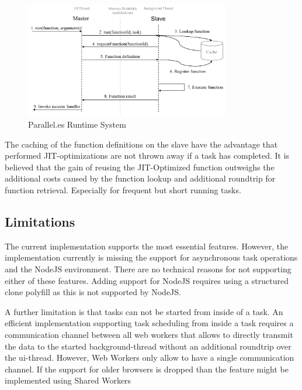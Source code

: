 \begin{figure}
	\centering
	\includegraphics[width=0.8\textwidth]{runtime-system.pdf}

	\caption{Parallel.es Runtime System}
	\label{fig:runtime-system}
\end{figure}

The caching of the function definitions on the slave have the advantage that performed JIT-optimizations are not thrown away if a task has completed. It is believed that the gain of reusing the JIT-Optimized function outweighs the additional costs caused by the function lookup and additional roundtrip for function retrieval. Especially for frequent but short running tasks. 


\subsection{Limitations}
The current implementation supports the most essential features. However, the implementation currently is missing the support for asynchronous task operations and the NodeJS environment. There are no technical reasons for not supporting either of these features. Adding support for NodeJS requires using a structured clone polyfill as this is not supported by NodeJS.

A further limitation is that tasks can not be started from inside of a task. An efficient implementation supporting task scheduling from inside a task requires a communication channel between all web workers that allows to directly transmit the data to the started background-thread without an additional roundtrip over the ui-thread. However, Web Workers only allow to have a single communication channel. If the support for older browsers is dropped than the feature might be implemented using Shared Workers~\cite[section 4.6.4]{w3cWebWorker}